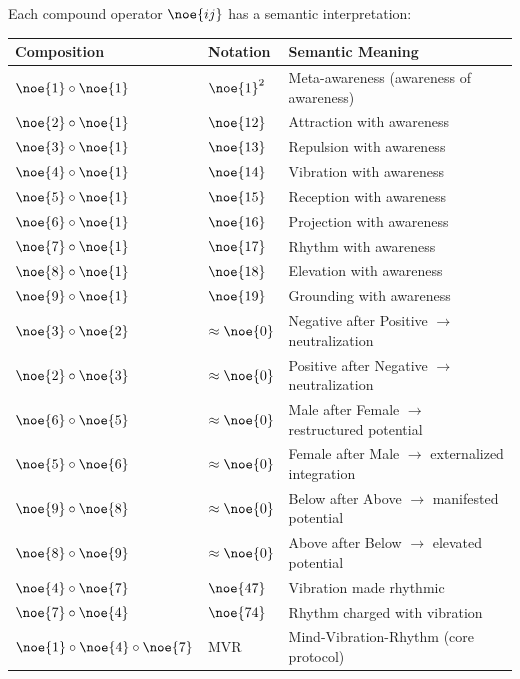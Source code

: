 \begin{definition}
\label{def:comp-semantics}
Each compound operator $\noe{ij}$ has a semantic interpretation:
\end{definition}

\begin{longtable}{lll}
\toprule
\textbf{Composition} & \textbf{Notation} & \textbf{Semantic Meaning} \\
\midrule
\endhead
$\noe{1} \circ \noe{1}$ & $\noe{1}^2$ & Meta-awareness (awareness of awareness) \\
$\noe{2} \circ \noe{1}$ & $\noe{12}$ & Attraction with awareness \\
$\noe{3} \circ \noe{1}$ & $\noe{13}$ & Repulsion with awareness \\
$\noe{4} \circ \noe{1}$ & $\noe{14}$ & Vibration with awareness \\
$\noe{5} \circ \noe{1}$ & $\noe{15}$ & Reception with awareness \\
$\noe{6} \circ \noe{1}$ & $\noe{16}$ & Projection with awareness \\
$\noe{7} \circ \noe{1}$ & $\noe{17}$ & Rhythm with awareness \\
$\noe{8} \circ \noe{1}$ & $\noe{18}$ & Elevation with awareness \\
$\noe{9} \circ \noe{1}$ & $\noe{19}$ & Grounding with awareness \\
\midrule
$\noe{3} \circ \noe{2}$ & $\approx\noe{0}$ & Negative after Positive $\to$ neutralization \\
$\noe{2} \circ \noe{3}$ & $\approx\noe{0}$ & Positive after Negative $\to$ neutralization \\
$\noe{6} \circ \noe{5}$ & $\approx\noe{0}$ & Male after Female $\to$ restructured potential \\
$\noe{5} \circ \noe{6}$ & $\approx\noe{0}$ & Female after Male $\to$ externalized integration \\
$\noe{9} \circ \noe{8}$ & $\approx\noe{0}$ & Below after Above $\to$ manifested potential \\
$\noe{8} \circ \noe{9}$ & $\approx\noe{0}$ & Above after Below $\to$ elevated potential \\
\midrule
$\noe{4} \circ \noe{7}$ & $\noe{47}$ & Vibration made rhythmic \\
$\noe{7} \circ \noe{4}$ & $\noe{74}$ & Rhythm charged with vibration \\
$\noe{1} \circ \noe{4} \circ \noe{7}$ & MVR & Mind-Vibration-Rhythm (core protocol) \\

\end{longtable}
